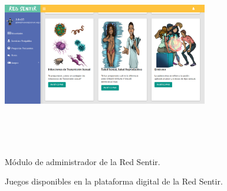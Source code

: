 \documentclass[a4paper]{article}
\begin{document}
\begin{figure}[t]
\centering
\includegraphics[width=0.8\textwidth,height=3.5in]{foros.png}
\caption{Módulo de administrador de la Red Sentir.}
\label{fig:foros}
\end{figure}

\begin{figure}[tbp]
  \centering
	  \hspace{1mm}
  \caption{Juegos disponibles en la plataforma digital de la Red Sentir.}
  \label{fig:juegos}
\end{figure}
\end{document}
